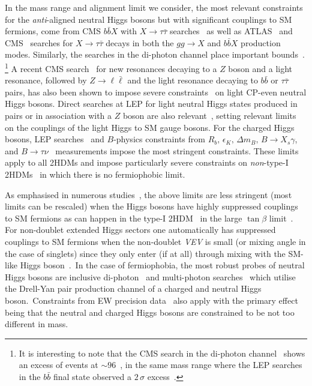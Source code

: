 \documentclass[../report.tex]{subfiles}
\begin{document}
\label{sec:limits}


In the mass range and alignment limit we consider, the most relevant
constraints for the \emph{anti}-aligned neutral Higgs bosons but with
significant couplings to SM fermions, come from CMS $b\bar{b}X$ with $X
\to \tau\bar{\tau}$ searches~\cite{Khachatryan:2015baw} as well as
ATLAS~\cite{Aad:2014vgg} and CMS~\cite{Khachatryan:2014wca} searches for
$X \to \tau\bar{\tau}$ decays in both the $gg \to X$ and $b\bar{b}X$
production modes. Similarly, the searches in the di-photon channel
  place important bounds~\cite{CMS-PAS-HIG-17-013,ATLAS-CONF-2018-025}.%
\footnote{It is interesting to note that the CMS search in the di-photon
  channel~\cite{CMS-PAS-HIG-17-013} shows an excess of events at $\sim
  96$~\UGeV, in the same mass range where the LEP searches in the 
  $b \bar b$ final state observed a $2\,\sigma$ excess~\cite{Schael:2006cr}.}
A recent CMS search~\cite{CMS:2015mba} for new
resonances decaying to a $Z$ boson and a light resonance, followed by 
$Z \to \ell\bar\ell$ and the light resonance decaying to $b\bar{b}$ or
$\tau\bar{\tau}$ pairs, has also been shown to impose severe
constraints~\cite{Bernon:2015wef} on light CP-even neutral Higgs
bosons. Direct searches at LEP for light neutral Higgs states produced
in pairs or in association with a $Z$ boson are also
relevant~\cite{Barate:2003sz,Abbiendi:2004gn,Schael:2006cr},
setting relevant limits on the couplings of the light Higgs to SM
gauge bosons. For
the charged Higgs bosons, LEP searches~\cite{Abbiendi:2013hk} and
$B$-physics constraints from $R_b,\,\epsilon_K,\,\Delta m_B,\,B\to
X_s\gamma$, and
$B\to\tau\nu$~\cite{Haisch:2008ar,Mahmoudi:2009zx,Gupta:2009wn,Jung:2010ik,Misiak:2015xwa}
measurements impose the most stringent constraints. These limits apply
to all 2HDMs and impose particularly severe constraints on
\emph{non}-type-I 2HDMs~\cite{Bernon:2015wef} in which there is no
fermiophobic limit.  

As emphasised in numerous studies~\cite{Ilisie:2014hea,Enberg:2016ygw,Delgado:2016arn,Degrande:2017naf,Vega:2018ddp}, the above limits are less stringent (most limits can be rescaled) when the Higgs bosons have highly suppressed couplings to SM fermions as can happen in the type-I 2HDM~\cite{Haber:1978jt} in the large $\tan\beta$ limit~\cite{Akeroyd:1995hg}. For non-doublet extended Higgs sectors one automatically has suppressed couplings to SM fermions when the non-doublet \emph{VEV} is small (or mixing angle in the case of singlets) since they only enter (if at all) through mixing with the SM-like Higgs boson~\cite{Killick:2013mya}.~In the case of fermiophobia, the most robust probes of neutral Higgs bosons are inclusive di-photon~\cite{Delgado:2016arn,Degrande:2017naf,Vega:2018ddp} and multi-photon searches~\cite{Akeroyd:2005pr,Abdallah:2003xf,Aaltonen:2016fnw} which utilise the Drell-Yan pair production channel of a charged and neutral Higgs boson.~Constraints from EW precision data~\cite{Baak:2011ze,ALEPH:2010aa} also apply with the primary effect being that the neutral and charged Higgs bosons are constrained to be not too different in mass.  
\end{document}
